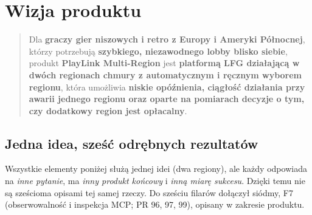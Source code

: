 \section{Wizja produktu}
\begin{quote}
Dla \textbf{graczy gier niszowych i retro z Europy i Ameryki Północnej}, którzy
potrzebują \textbf{szybkiego, niezawodnego lobby blisko siebie}, produkt
\textbf{PlayLink Multi-Region} jest \textbf{platformą LFG działającą w dwóch
regionach chmury z automatycznym i ręcznym wyborem regionu}, która umożliwia
\textbf{niskie opóźnienia, ciągłość działania przy awarii jednego regionu oraz
oparte na pomiarach decyzje o tym, czy dodatkowy region jest opłacalny}.
\end{quote}

\subsection{Jedna idea, sześć odrębnych rezultatów}
\label{sec:wizja-filary}
Wszystkie elementy poniżej służą jednej idei (dwa regiony), ale każdy odpowiada na
\emph{inne pytanie}, ma \emph{inny produkt końcowy} i \emph{inną miarę sukcesu}.
Dzięki temu nie są sześcioma opisami tej samej rzeczy. Do sześciu filarów dołączył
siódmy, F7 (obserwowalność i inspekcja MCP; PR 96, 97, 99), opisany w zakresie
produktu.

